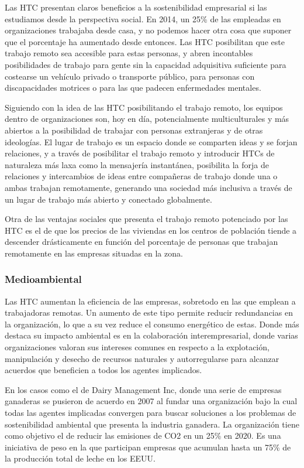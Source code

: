 Las HTC presentan claros beneficios a la sostenibilidad empresarial si las estudiamos desde la perspectiva social. En 2014, un 25\%\cite{frost} de las empleadas en organizaciones trabajaba desde casa, y no podemos hacer otra cosa que suponer que el porcentaje ha aumentado desde entonces. Las HTC posibilitan que este trabajo remoto sea accesible para estas personas, y abren incontables posibilidades de trabajo para gente sin la capacidad adquisitiva suficiente para costearse un vehículo privado o transporte público, para personas con discapacidades motrices o para las que padecen enfermedades mentales.

Siguiendo con la idea de las HTC posibilitando el trabajo remoto, los equipos dentro de organizaciones son, hoy en día, potencialmente multiculturales y más abiertos a la posibilidad de trabajar con personas extranjeras y de otras ideologías. El lugar de trabajo es un espacio donde se comparten ideas y se forjan relaciones, y a través de posibilitar el trabajo remoto y introducir HTCs de naturaleza más laxa como la mensajería instantánea, posibilita la forja de relaciones y intercambios de ideas entre compañeras de trabajo donde una o ambas trabajan remotamente, generando una sociedad más inclusiva a través de un lugar de trabajo más abierto y conectado globalmente.

Otra de las ventajas sociales que presenta el trabajo remoto potenciado por las HTC es el de que los precios de las viviendas en los centros de población tiende a descender drásticamente en función del porcentaje de personas que trabajan remotamente en las empresas situadas en la zona\cite{adrianne}.

\subsubsection{Medioambiental}

Las HTC aumentan la eficiencia de las empresas, sobretodo en las que emplean a trabajadoras remotas. Un aumento de este tipo permite reducir redundancias en la organización, lo que a su vez reduce el consumo energético de estas. Donde más destaca su impacto ambiental es en la colaboración interempresarial, donde varias organizaciones valoran sus intereses comunes en respecto a la explotación, manipulación y desecho de recursos naturales y autorregularse para alcanzar acuerdos que beneficien a todos los agentes implicados.

En los casos como el de Dairy Management Inc, donde una serie de empresas ganaderas se pusieron de acuerdo en 2007 al fundar una organización bajo la cual todas las agentes implicadas convergen para buscar soluciones a los problemas de sostenibilidad ambiental que presenta la industria ganadera. La organización tiene como objetivo el de reducir las emisiones de CO2 en un 25\% en 2020. Es una iniciativa de peso en la que participan empresas que acumulan hasta un 75\% de la producción total de leche en los EEUU\cite{ram}.

